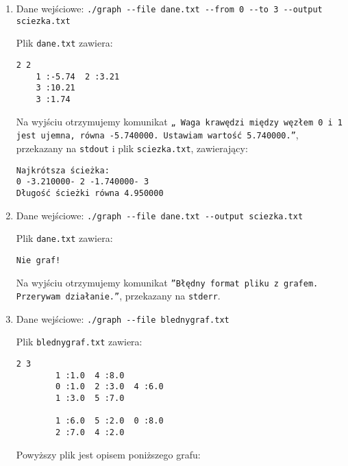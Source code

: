 \documentclass[]{article}
\begin{document}
\begin{enumerate}
    \item Dane wejściowe: \texttt{./graph -{}-file dane.txt -{}-from 0 -{}-to 3 -{}-output sciezka.txt}
    
Plik \texttt{dane.txt} zawiera:
\begin{verbatim}
2 2
    1 :-5.74  2 :3.21
    3 :10.21
    3 :1.74
\end{verbatim}
Na wyjściu otrzymujemy komunikat \texttt{„ Waga krawędzi między węzłem 0 i 1 jest ujemna, równa -5.740000. Ustawiam wartość 5.740000.”}, przekazany na \texttt{stdout} i plik \texttt{sciezka.txt}, zawierający:
\begin{verbatim}
Najkrótsza ścieżka: 
0 -3.210000- 2 -1.740000- 3
Długość ścieżki równa 4.950000
\end{verbatim}
    \item Dane wejściowe: \texttt{./graph -{}-file dane.txt -{}-output sciezka.txt}

Plik \texttt{dane.txt} zawiera:
\begin{verbatim}
Nie graf!
\end{verbatim}
Na wyjściu otrzymujemy komunikat \texttt{”Błędny format pliku z grafem. Przerywam działanie.”}, przekazany na \texttt{stderr}.

    \item Dane wejściowe: \texttt{./graph -{}-file blednygraf.txt}
    
Plik \texttt{blednygraf.txt} zawiera:
\begin{verbatim}
2 3
        1 :1.0  4 :8.0
        0 :1.0  2 :3.0  4 :6.0
        1 :3.0  5 :7.0

        1 :6.0  5 :2.0  0 :8.0
        2 :7.0  4 :2.0
\end{verbatim}
Powyższy plik jest opisem poniższego grafu:
\begin{figure}[!h]
\centering
\end{figure}
\end{enumerate}
\end{document}
